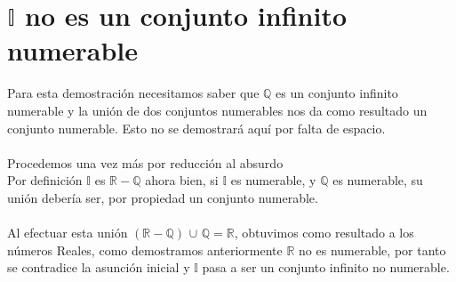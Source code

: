 \documentclass[]{article}
\begin{document}
	\section*{$\mathbb{I}$ no es un conjunto infinito numerable}
Para esta demostración necesitamos saber que $\mathbb{Q}$ es un conjunto infinito numerable y la unión de dos conjuntos numerables nos da como resultado un conjunto numerable. Esto no se demostrará aquí por falta de espacio.\\\\
Procedemos una vez más por reducción al absurdo\\
Por definición $\mathbb{I}$ es $\mathbb{R} - \mathbb{Q}$ ahora bien, si $\mathbb{I}$ es numerable, y $\mathbb{Q}$ es numerable, su unión debería ser, por propiedad un conjunto numerable.\\\\
Al efectuar esta unión $(\mathbb{R} - \mathbb{Q})$	$\cup$ $\mathbb{Q} = \mathbb{R}$, obtuvimos como resultado a los números Reales, como demostramos anteriormente $\mathbb{R}$ no es numerable, por tanto se contradice la asunción inicial y $\mathbb{I}$ pasa a ser un conjunto infinito no numerable.
\\\\\\\
\end{document}
